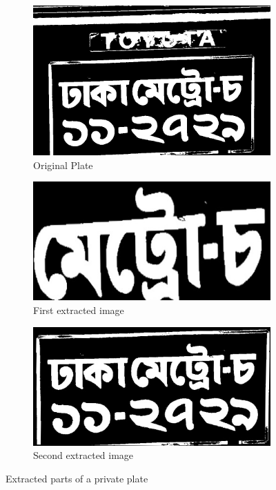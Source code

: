\begin{figure}
\begin{subfigure}{\textwidth}
    \centering
    \includegraphics[width=0.5\linewidth]{./img/experiment/stage.10/02-private}
    \caption{Original Plate}
\end{subfigure}
\begin{subfigure}{0.5\textwidth}
    \centering
    \includegraphics[width=0.9\linewidth]{./img/experiment/stage.13/00-02-private}
    \caption{First extracted image}
\end{subfigure}
\begin{subfigure}{0.5\textwidth}
    \centering
    \includegraphics[width=0.9\linewidth]{./img/experiment/stage.13/01-02-private}
    \caption{Second extracted image}
\end{subfigure}
\caption{Extracted parts of a private plate}
\label{fig:ExtractedResult4}
\end{figure}



